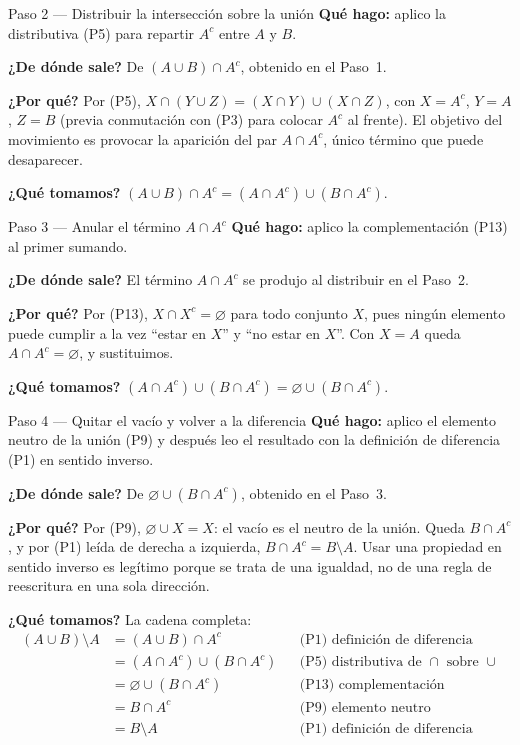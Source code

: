 \documentclass[11pt]{article}
\begin{document}
\begin{paso}{Paso 2 --- Distribuir la intersección sobre la unión}
\textbf{Qué hago:} aplico la distributiva (P5) para repartir $A^{c}$ entre $A$ y $B$.

\textbf{¿De dónde sale?} De $(A\cup B)\cap A^{c}$, obtenido en el Paso~1.

\textbf{¿Por qué?} Por (P5), $X\cap(Y\cup Z)=(X\cap Y)\cup(X\cap Z)$, con $X=A^{c}$, $Y=A$,
$Z=B$ (previa conmutación con (P3) para colocar $A^{c}$ al frente). El objetivo del movimiento es
provocar la aparición del par $A\cap A^{c}$, único término que puede desaparecer.

\textbf{¿Qué tomamos?} $(A\cup B)\cap A^{c}=(A\cap A^{c})\cup(B\cap A^{c})$.
\end{paso}

\begin{paso}{Paso 3 --- Anular el término $A\cap A^{c}$}
\textbf{Qué hago:} aplico la complementación (P13) al primer sumando.

\textbf{¿De dónde sale?} El término $A\cap A^{c}$ se produjo al distribuir en el Paso~2.

\textbf{¿Por qué?} Por (P13), $X\cap X^{c}=\varnothing$ para todo conjunto $X$, pues ningún
elemento puede cumplir a la vez ``estar en $X$'' y ``no estar en $X$''. Con $X=A$ queda
$A\cap A^{c}=\varnothing$, y sustituimos.

\textbf{¿Qué tomamos?} $(A\cap A^{c})\cup(B\cap A^{c})=\varnothing\cup(B\cap A^{c})$.
\end{paso}

\begin{paso}{Paso 4 --- Quitar el vacío y volver a la diferencia}
\textbf{Qué hago:} aplico el elemento neutro de la unión (P9) y después leo el resultado con la
definición de diferencia (P1) en sentido inverso.

\textbf{¿De dónde sale?} De $\varnothing\cup(B\cap A^{c})$, obtenido en el Paso~3.

\textbf{¿Por qué?} Por (P9), $\varnothing\cup X=X$: el vacío es el neutro de la unión. Queda
$B\cap A^{c}$, y por (P1) leída de derecha a izquierda, $B\cap A^{c}=B\setminus A$. Usar una
propiedad en sentido inverso es legítimo porque se trata de una igualdad, no de una regla de
reescritura en una sola dirección.

\textbf{¿Qué tomamos?} La cadena completa:
\begin{align*}
(A\cup B)\setminus A
&=(A\cup B)\cap A^{c} && \text{(P1) definición de diferencia}\\
&=(A\cap A^{c})\cup(B\cap A^{c}) && \text{(P5) distributiva de }\cap\text{ sobre }\cup\\
&=\varnothing\cup(B\cap A^{c}) && \text{(P13) complementación}\\
&=B\cap A^{c} && \text{(P9) elemento neutro}\\
&=B\setminus A && \text{(P1) definición de diferencia}
\end{align*}
\end{paso}
\end{document}
